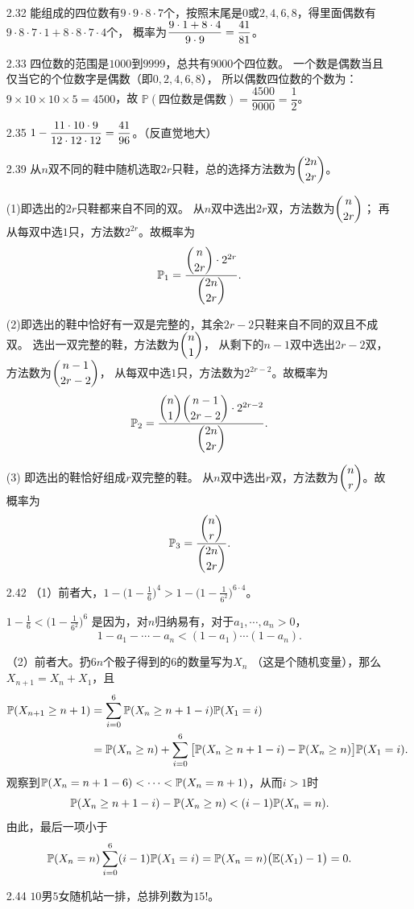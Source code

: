\begin{itemize}
    \item[2.32]
    能组成的四位数有$9\cdot9\cdot8\cdot7$个，按照末尾是$0$或$2,4,6,8$，得里面偶数有
    $9\cdot8\cdot7\cdot1+8\cdot8\cdot7\cdot4$个，
    概率为$\displaystyle \frac{9\cdot1+8\cdot4}{9\cdot9}=\frac{41}{81}$。
    \item[2.33]
    四位数的范围是$1000$到$9999$，总共有$9000$个四位数。
    一个数是偶数当且仅当它的个位数字是偶数（即$0, 2, 4, 6, 8$），
    所以偶数四位数的个数为：$9 \times 10 \times 10 \times 5 = 4500$，故
    $\mathbb{P}(\text{四位数是偶数}) = \dfrac{4500}{9000} = \dfrac{1}{2}$。
    \item[2.35]
    $\displaystyle 1-\frac{11\cdot10\cdot9}{12\cdot12\cdot12}=\frac{41}{96}$。（反直觉地大）
    \item[2.39]
    从$n$双不同的鞋中随机选取$2r$只鞋，总的选择方法数为$\dbinom{2n}{2r}$。
    
    (1)即选出的$2r$只鞋都来自不同的双。
    从$n$双中选出$2r$双，方法数为$\dbinom{n}{2r}$；
    再从每双中选$1$只，方法数$2^{2r}$。故概率为
    \[\mathbb{P}_1 = \frac{\dbinom{n}{2r} \cdot 2^{2r}}{\dbinom{2n}{2r}}.\]

    (2)即选出的鞋中恰好有一双是完整的，其余$2r-2$只鞋来自不同的双且不成双。
    选出一双完整的鞋，方法数为$\dbinom{n}{1}$，
    从剩下的$n-1$双中选出$2r-2$双，方法数为$\dbinom{n-1}{2r-2}$，
    从每双中选$1$只，方法数为$2^{2r-2}$。故概率为
    \[\mathbb{P}_2 = \frac{\dbinom{n}{1} \dbinom{n-1}{2r-2} \cdot 2^{2r-2}}{\dbinom{2n}{2r}}.\]

    (3) 即选出的鞋恰好组成$r$双完整的鞋。
    从$n$双中选出$r$双，方法数为$\dbinom{n}{r}$。故概率为
    \[\mathbb{P}_3 = \dfrac{\dbinom{n}{r}}{\dbinom{2n}{2r}}.\]

    \item[2.42]
    （1）前者大，$1-\big(1-\frac{1}{6}\big)^4>1-\big(1-\frac{1}{6^2}\big)^{6\cdot4}$。

    $1-\frac{1}{6}<\big(1-\frac{1}{6^2}\big)^6$
    是因为，对$n$归纳易有，对于$a_1,\cdots,a_n>0$，
    $$1-a_1-\cdots-a_n<(1-a_1)\cdots(1-a_n).$$

    （2）前者大。扔$6n$个骰子得到的$6$的数量写为$X_n$
    （这是个随机变量），那么$X_{n+1}=X_n+X_1$，且
    \begin{align*}
        \mathbb{P}(X_{n+1}\ge n+1)&=\sum_{i=0}^6\mathbb{P}(X_n\ge n+1-i)\mathbb{P}(X_1=i)\\
        &=\mathbb{P}(X_n\ge n)+\sum_{i=0}^6\big[\mathbb{P}(X_n\ge n+1-i)-\mathbb{P}(X_n\ge n)\big]\mathbb{P}(X_1=i).
    \end{align*}
    观察到$\mathbb{P}(X_n=n+1-6)<\cdots<\mathbb{P}(X_n=n+1)$，从而$i>1$时
    $$\mathbb{P}(X_n\ge n+1-i)-\mathbb{P}(X_n\ge n)<(i-1)\mathbb{P}(X_n=n).$$
    由此，最后一项小于
    $$\mathbb{P}(X_n=n)\sum_{i=0}^6(i-1)\mathbb{P}(X_1=i)=\mathbb{P}(X_n=n)\big(\mathbb{E}(X_1)-1\big)=0.$$
    \item[2.44]
    $10$男$5$女随机站一排，总排列数为$15!$。
    

\end{itemize}
